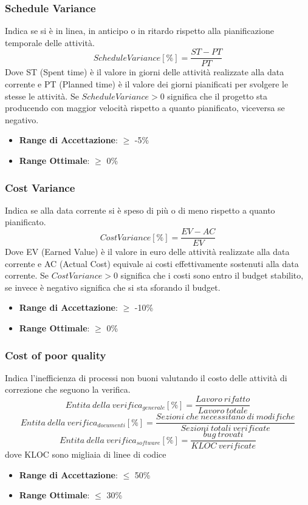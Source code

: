 \documentclass[12pt,a4paper]{article}
\begin{document}
\subsubsection{Schedule Variance}
Indica se si è in linea, in anticipo o in ritardo rispetto alla pianificazione temporale delle attività.
\[ScheduleVariance [\%] = \frac{ST - PT}{PT}\]
Dove ST (Spent time) è il valore in giorni delle attività realizzate alla data corrente e PT (Planned time) è il valore dei giorni pianificati per svolgere le stesse le attività.
Se $ScheduleVariance > 0$ significa che il progetto sta producendo con maggior velocità rispetto a quanto pianificato, viceversa se negativo.
\begin{itemize}
\item \textbf{Range di Accettazione}: $\geq$ -5\%
\item \textbf{Range Ottimale}: $\geq$ 0\%
\end{itemize}
\subsubsection{Cost Variance}
Indica se alla data corrente si è speso di più o di meno rispetto a quanto pianificato.
\[CostVariance [\%] = \frac{EV - AC}{EV}\]
Dove EV (Earned Value) è il valore in euro delle attività realizzate alla data corrente e AC (Actual Cost) equivale ai costi effettivamente sostenuti alla data corrente.
Se $CostVariance > 0$ significa che i costi sono entro il budget stabilito, se invece è negativo significa che si sta sforando il budget.
\begin{itemize}
\item \textbf{Range di Accettazione}: $\geq$ -10\%
\item \textbf{Range Ottimale}: $\geq$ 0\%
\end{itemize}
\subsubsection{Cost of poor quality}
Indica l'inefficienza di processi non buoni valutando il costo delle attività di correzione che seguono la verifica.
	\[Entita\ della\ verifica_{generale}[\%]= \frac{Lavoro\ rifatto}{Lavoro\ totale}\]
	\[Entita\ della\ verifica_{documenti}[\%]= \frac{Sezioni\ che\ necessitano\ di\ modifiche}{Sezioni\ totali\ verificate}\]
	\[Entita\ della\ verifica_{software}[\%]= \frac{bug\ trovati}{KLOC\ verificate}\]
dove KLOC sono migliaia di linee di codice
\begin{itemize}
	\item \textbf{Range di Accettazione}: $\leq$ 50\%
	\item \textbf{Range Ottimale}: $\leq$ 30\%
\end{itemize}
\end{document}
